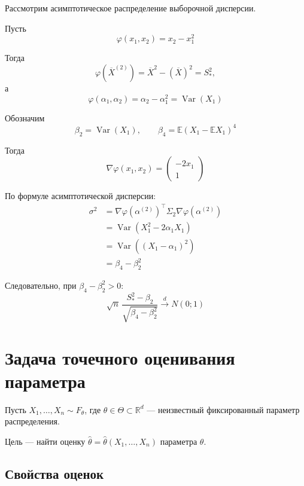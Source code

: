 \documentclass[12pt,a4paper]{article}
\begin{document}
\begin{example}
Рассмотрим асимптотическое распределение выборочной дисперсии.

Пусть
\[
\varphi(x_1,x_2)=x_2-x_1^2
\]

Тогда
\[
\varphi(\overline{X}^{(2)})
=
\overline{X}^{2}-(\overline{X})^2
=
S_*^2,
\]
а
\[
\varphi(\alpha_1,\alpha_2)
=
\alpha_2-\alpha_1^2
=
\operatorname{Var}(X_1)
\]

Обозначим
\[
\beta_2=\operatorname{Var}(X_1),
\qquad
\beta_4=\mathbb{E}(X_1-\mathbb{E}X_1)^4
\]

Тогда
\[
\nabla\varphi(x_1,x_2)
=
\begin{pmatrix}
-2x_1\\
1
\end{pmatrix}
\]

По формуле асимптотической дисперсии:
\[
\begin{aligned}
\sigma^2
&=
\nabla\varphi(\alpha^{(2)})^\top
\Sigma_2
\nabla\varphi(\alpha^{(2)})
\\
&=
\operatorname{Var}\left(
X_1^2-2\alpha_1X_1
\right)
\\
&=
\operatorname{Var}\left(
(X_1-\alpha_1)^2
\right)
\\
&=
\beta_4-\beta_2^2
\end{aligned}
\]

Следовательно, при $\beta_4-\beta_2^2>0$:
\[
\sqrt{n}\,
\frac{S_*^2-\beta_2}
{\sqrt{\beta_4-\beta_2^2}}
\xrightarrow{d}N(0;1)
\]
\end{example}

\newpage

\section{Задача точечного оценивания параметра}

Пусть $X_1,\ldots,X_n \sim F_\theta$, где $\theta \in \Theta \subset \mathbb{R}^d$ — неизвестный фиксированный параметр распределения.

Цель — найти оценку $\hat{\theta}=\hat{\theta}(X_1,\ldots,X_n)$ параметра $\theta$.

\subsection{Свойства оценок}
\end{document}
